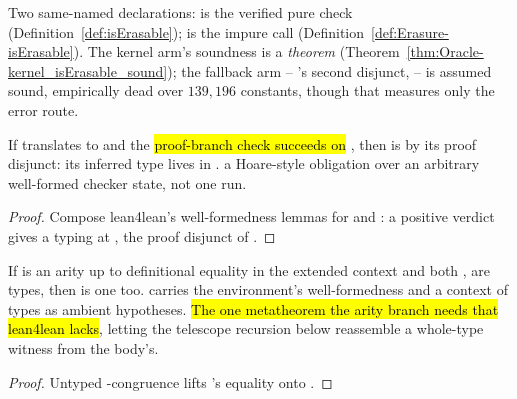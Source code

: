 \begin{remark}
 Two same-named declarations:  is the verified pure
check (Definition~\ref{def:isErasable});  is the impure call
(Definition~\ref{def:Erasure-isErasable}). The kernel arm's soundness is a \emph{theorem}
(Theorem~\ref{thm:Oracle-kernel_isErasable_sound}); the fallback arm --
's second disjunct,  -- is assumed sound,
empirically dead over $139{,}196$ constants, though that measures only the error route.
\end{remark}

\begin{lemma}
\label{lem:isErasableProp-WF}
\leanok
{} If  translates to  and the \hl{proof-branch check succeeds on
}, then  is \Erasable{} by its proof disjunct: its inferred type lives in
.
 a Hoare-style obligation over an arbitrary well-formed checker state, not one run.
\end{lemma}
\begin{proof}
\leanok
{}
 Compose lean4lean's well-formedness lemmas for  and : a
positive verdict gives a typing at , the proof disjunct of \Erasable{}.
\end{proof}

\begin{lemma}
\label{lem:IsArityUpTo-forallE}
\leanok
{} If  is an arity up to definitional equality in the extended context and
both ,  are types, then  is one too.
 carries the environment's well-formedness and a context of types as ambient
hypotheses. \hl{The one metatheorem the arity branch needs that lean4lean lacks}, letting the
telescope recursion below reassemble a whole-type witness from the body's.
\end{lemma}
\begin{proof}
\leanok
{}
 Untyped -congruence lifts 's equality onto .
\end{proof}

